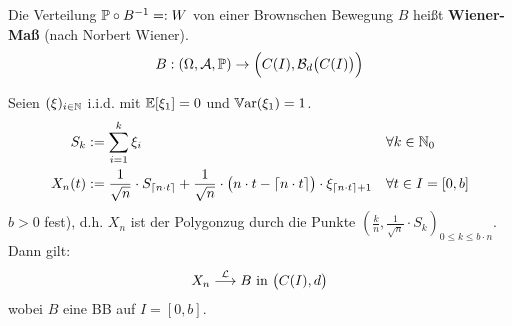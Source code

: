 Die Verteilung $\P\circ B^{-1}=:W$ von  einer Brownschen Bewegung $B$ heißt \textbf{Wiener-Maß} (nach Norbert Wiener).
\begin{align*}
	B:(\Omega,\A,\P)\to\Big(C(I),\B_d\big(C(I)\big)\Big)
\end{align*}

\begin{satz}[Donsker]\label{satz7.16Donsker}%
	Seien $(\xi)_{i\in\N}$ i.i.d. mit $\E[\xi_1]=0$ und $\Var(\xi_1)=1$.
	\begin{align*}
		S_k&:=\sum\limits_{i=1}^k\xi_i&\forall& k\in\N_0\\
		X_n(t)&:=\frac{1}{\sqrt{n}}\cdot S_{\lceil n\cdot t\rceil}+\frac{1}{\sqrt{n}}\cdot\big(n\cdot t-\lceil n\cdot t\rceil\big)\cdot\xi_{\lceil n\cdot t\rceil+1} &\forall& t\in I=[0,b]
	\end{align*}
	$b>0$ fest), d.h. $X_n$ ist der Polygonzug durch die Punkte $\left(\frac{k}{n},\frac{1}{\sqrt{n}}\cdot S_k\right)_{0\leq k\leq b\cdot n}$. Dann gilt:
	\begin{align*}
		X_n\stackrel{\L}{\longrightarrow} B\text{ in }\big(C(I),d\big)
	\end{align*}
	wobei $B$ eine BB auf $I=[0,b]$.
\end{satz}


